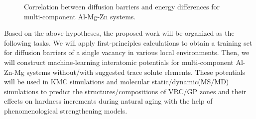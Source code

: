 \newpage
\begingroup
\begin{figure}[!ht]
  \centering
\caption[Correlation between diffusion barriers and energy differences for multi-component Al-Mg-Zn systems]{Correlation between diffusion barriers and energy differences for multi-component Al-Mg-Zn systems.}
  \label{Chap:Al/Vac:fig2}
\end{figure}
\endgroup


Based on the above hypotheses, the proposed work will be organized as the following tasks. We will apply first-principles calculations to obtain a training set for diffusion barriers of a single vacancy in various local environments. Then, we will construct machine-learning interatomic potentials for multi-component Al-Zn-Mg systems without/with suggested trace solute elements. These potentials will be used in \ac{KMC} simulations and molecular static/dynamic(MS/MD) simulations to predict the structures/compositions of \ac{VRC}/\ac{GP} zones and their effects on hardness increments during natural aging with the help of phenomenological strengthening models.